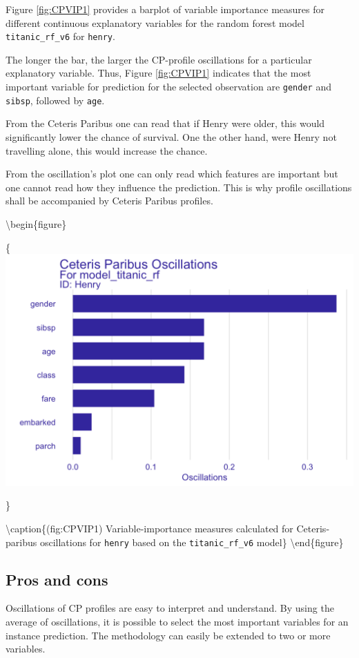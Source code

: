 \documentclass[12pt,]{krantz}
\theoremstyle{definition}
\theoremstyle{definition}
\theoremstyle{definition}
\theoremstyle{remark}
\begin{document}
Figure \ref{fig:CPVIP1} provides a barplot of variable importance
measures for different continuous explanatory variables for the random
forest model \texttt{titanic\_rf\_v6} for \texttt{henry}.

The longer the bar, the larger the CP-profile oscillations for a
particular explanatory variable. Thus, Figure \ref{fig:CPVIP1} indicates
that the most important variable for prediction for the selected
observation are \texttt{gender} and \texttt{sibsp}, followed by
\texttt{age}.

From the Ceteris Paribus one can read that if Henry were older, this
would significantly lower the chance of survival. One the other hand,
were Henry not travelling alone, this would increase the chance.

From the oscillation's plot one can only read which features are
important but one cannot read how they influence the prediction. This is
why profile oscillations shall be accompanied by Ceteris Paribus
profiles.

\textbackslash{}begin\{figure\}

\{\centering \includegraphics[width=0.75\linewidth]{figure/oscillations_all_rf_plot}

\}

\textbackslash{}caption\{(fig:CPVIP1) Variable-importance measures
calculated for Ceteris-paribus oscillations for \texttt{henry} based on
the \texttt{titanic\_rf\_v6} model\}\label{fig:CPVIP1}
\textbackslash{}end\{figure\}

\hypertarget{CPOscProsCons}{%
\subsection{Pros and cons}\label{CPOscProsCons}}

Oscillations of CP profiles are easy to interpret and understand. By
using the average of oscillations, it is possible to select the most
important variables for an instance prediction. The methodology can
easily be extended to two or more variables.
\end{document}
